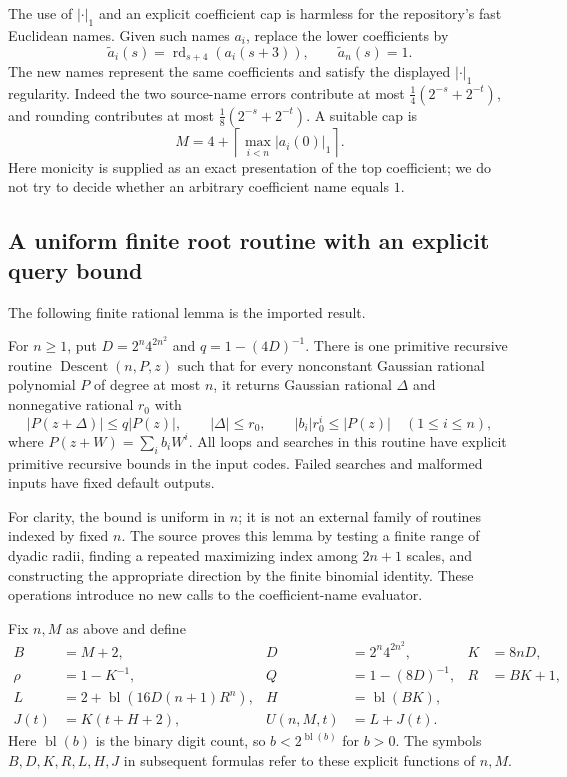 The use of $|\cdot|_1$ and an explicit coefficient cap is harmless for
the repository's fast Euclidean names.  Given such names $a_i$, replace
the lower coefficients by
\[
 \widetilde a_i(s)=\operatorname{rd}_{s+4}(a_i(s+3)),
 \qquad \widetilde a_n(s)=1.
\]
The new names represent the same coefficients and satisfy the displayed
$|\cdot|_1$ regularity.  Indeed the two source-name errors contribute at
most $\tfrac14(2^{-s}+2^{-t})$, and rounding contributes at most
$\tfrac18(2^{-s}+2^{-t})$.  A suitable cap is
\[
 M=4+\left\lceil\max_{i<n}|a_i(0)|_1\right\rceil.
\]
Here monicity is supplied as an exact presentation of the top coefficient;
we do not try to decide whether an arbitrary coefficient name equals $1$.

\subsection{A uniform finite root routine with an explicit query bound}

The following finite rational lemma is the imported result.

\begin{lemma}\label{lem:fta-descent-contract}
For $n\ge1$, put $D=2^n4^{2n^2}$ and $q=1-(4D)^{-1}$.
There is one primitive recursive routine
$\operatorname{Descent}(n,P,z)$ such that for every nonconstant Gaussian
rational polynomial $P$ of degree at most $n$, it returns Gaussian rational
$\Delta$ and nonnegative rational $r_0$ with
\[
 |P(z+\Delta)|\le q|P(z)|,\qquad |\Delta|\le r_0,
 \qquad |b_i|r_0^i\le |P(z)|\quad(1\le i\le n),
\]
where $P(z+W)=\sum_i b_iW^i$.
All loops and searches in this routine have explicit primitive recursive
bounds in the input codes.  Failed searches and malformed inputs have
fixed default outputs.
\end{lemma}

For clarity, the bound is uniform in $n$; it is not an external family
of routines indexed by fixed $n$.  The source proves this lemma by
testing a finite range of dyadic radii, finding a repeated maximizing
index among $2n+1$ scales, and constructing the appropriate direction by
the finite binomial identity.  These operations introduce no new calls
to the coefficient-name evaluator.

Fix $n,M$ as above and define
\begin{align*}
 B&=M+2, &D&=2^n4^{2n^2}, &K&=8nD,\\
 \rho&=1-K^{-1}, &Q&=1-(8D)^{-1}, &R&=BK+1,\\
 L&=2+\operatorname{bl}(16D(n+1)R^n),
 &H&=\operatorname{bl}(BK),\\
 J(t)&=K(t+H+2), &U(n,M,t)&=L+J(t).
 \tag{F2}\label{eq:fta-constants}
\end{align*}
Here $\operatorname{bl}(b)$ is the binary digit count, so
$b<2^{\operatorname{bl}(b)}$ for $b>0$.
The symbols $B,D,K,R,L,H,J$ in subsequent formulas refer to these explicit
functions of $n,M$.

